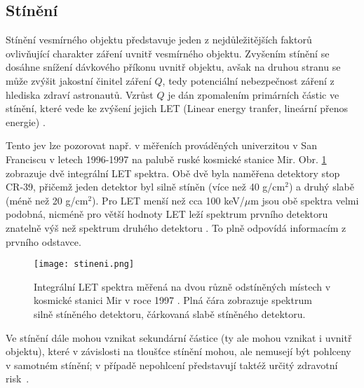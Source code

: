 \subsection{Stínění}\label{sec:kosmickeZareni_stineni}
Stínění vesmírného objektu představuje jeden z nejdůležitějších faktorů ovlivňující charakter záření uvnitř vesmírného objektu. Zvyšením stínění se dosáhne snížení dávkového příkonu uvnitř objektu, avšak na druhou stranu se může zvýšit jakostní činitel záření $Q$, tedy potenciální nebezpečnost záření z hlediska zdraví astronautů. Vzrůst $Q$ je dán zpomalením primárních částic ve stínění, které vede ke zvýšení jejich LET (Linear energy tranfer, lineární přenos energie) \cite{toNemecky}.

Tento jev lze pozorovat např. v měřeních prováděných univerzitou v San Franciscu v letech 1996-1997 na palubě ruské kosmické stanice Mir. Obr. \ref{fig:stineni} zobrazuje dvě integrální LET spektra. Obě dvě byla naměřena detektory stop CR-39, přičemž jeden detektor byl silně stíněn (více než 40 g/cm$^2$) a druhý slabě (méně než 20 g/cm$^2$). Pro LET menší než cca 100 keV/$\mu$m jsou obě spektra velmi podobná, nicméně pro větší hodnoty LET leží spektrum prvního detektoru znatelně výš než spektrum druhého detektoru \cite{benton}. To plně odpovídá informacím z prvního odstavce.
\begin{figure}[H]
  \centering
  \texttt{[image: stineni.png]}
  \caption{Integrální LET spektra měřená na dvou různě odstíněných místech v kosmické stanici Mir v roce 1997 \cite{benton}. Plná čára zobrazuje spektrum silně stíněného detektoru, čárkovaná slabě stíněného detektoru.}
  \label{fig:stineni}
\end{figure}

Ve stínění dále mohou vznikat sekundární částice (ty ale mohou vznikat i uvnitř objektu), které v závislosti na tloušťce stínění mohou, ale nemusejí být pohlceny v samotném stínění; v případě nepohlcení představují taktéž určitý zdravotní risk~\cite{benton}. 


